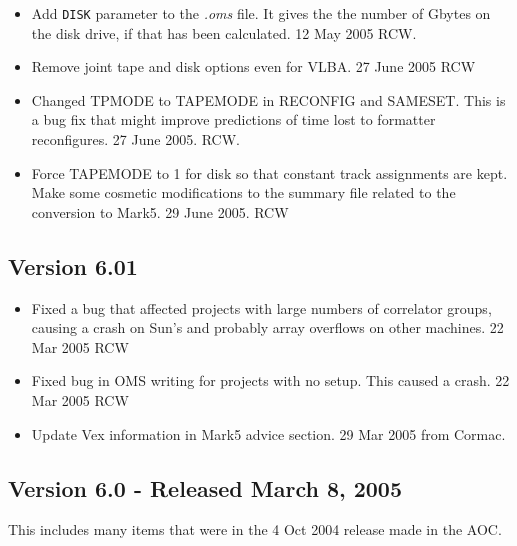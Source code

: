 \documentclass{report}
\begin{document}
\begin{itemize}
\item Add {\tt DISK} parameter to the {\sl .oms} file.  It gives the
the number of Gbytes on the disk drive, if that has been calculated.
12 May 2005  RCW.

\item Remove joint tape and disk options even for VLBA. 27 June 2005 RCW

\item Changed TPMODE to TAPEMODE in RECONFIG and SAMESET.  This is a bug
fix that might improve predictions of time lost to formatter reconfigures.
27 June 2005.  RCW.

\item Force TAPEMODE to 1 for disk so that constant track assignments
are kept.  Make some cosmetic modifications to the summary file related
to the conversion to Mark5. 29 June 2005.  RCW


\end{itemize}

\subsection{\label{SSEC:VER_6.01}Version 6.01}

\begin{itemize}


\item Fixed a bug that affected projects with large numbers of correlator
groups, causing a crash on Sun's and probably array overflows on other
machines. 22 Mar 2005 RCW

\item Fixed bug in OMS writing for projects with no setup.  This caused
a crash.  22 Mar 2005 RCW

\item Update Vex information in Mark5 advice section.  29 Mar 2005 from
Cormac.

\end{itemize}

\subsection{\label{SSSEC:MAR2005}Version 6.0 - Released March 8, 2005}

This includes many items that were in the 4 Oct 2004 release made
in the AOC.
\end{document}
